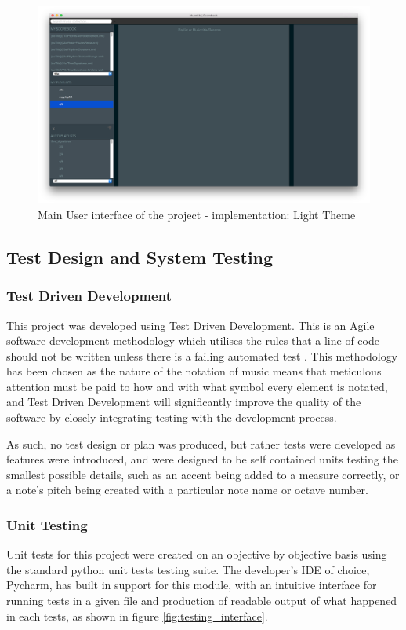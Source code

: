\begin{figure}[H]
	\centering
    \includegraphics[width=400pt]{designs/main_dark.png}
    \caption{Main User interface of the project - implementation: Light Theme}
    \label{fig:main_dark}
\end{figure}
\subsection{Test Design and System Testing}
\subsubsection{Test Driven Development}
This project was developed using Test Driven Development. This is an Agile software development methodology which utilises the rules that a line of code should not be written unless there is a failing automated test \parencite{TDD}. This methodology has been chosen as the nature of the notation of music means that meticulous attention must be paid to how and with what symbol every element is notated, and Test Driven Development will significantly improve the quality of the software by closely integrating testing with the development process.

As such, no test design or plan was produced, but rather tests were developed as features were introduced, and were designed to be self contained units testing the smallest possible details, such as an accent being added to a measure correctly, or a note's pitch being created with a particular note name or octave number.

\subsubsection{Unit Testing}
Unit tests for this project were created on an objective by objective basis using the standard python unit tests testing suite. The developer's IDE of choice, Pycharm, has built in support for this module, with an intuitive interface for running tests in a given file and production of readable output of what happened in each tests, as shown in figure \ref{fig:testing_interface}.

